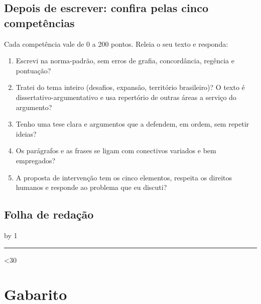 \documentclass[11pt]{article}
\begin{document}
\subsection*{Depois de escrever: confira pelas cinco competências}
Cada competência vale de 0 a 200 pontos. Releia o seu texto e responda:
\begin{enumerate}[label=\textbf{C\arabic*}]
\item Escrevi na norma-padrão, sem erros de grafia, concordância, regência e pontuação?
\item Tratei do tema inteiro (desafios, expansão, território brasileiro)? O texto é dissertativo-argumentativo e
      usa repertório de outras áreas a serviço do argumento?
\item Tenho uma tese clara e argumentos que a defendem, em ordem, sem repetir ideias?
\item Os parágrafos e as frases se ligam com conectivos variados e bem empregados?
\item A proposta de intervenção tem os cinco elementos, respeita os direitos humanos e responde ao problema que eu discuti?
\end{enumerate}

\clearpage
\subsection*{Folha de redação}
\newcount\linharedacao {}
\vspace{0.6em}
{\setlength{\parskip}{0pt}%
\loop\advance\linharedacao by 1
  \noindent\makebox[1.6em][r]{\sffamily\scriptsize\color{fgsoft}\the\linharedacao}\hspace{0.4em}%
  {\color{regua}\rule{\dimexpr\linewidth-2em\relax}{0.4pt}}\par\vspace{0.22cm}%
\ifnum\linharedacao<30\repeat}

\clearpage
\section*{Gabarito}
\imprimirgabarito
\end{document}
